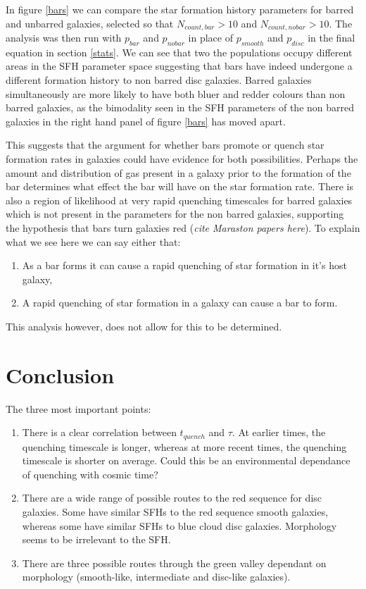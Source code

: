 \documentclass{mn2e}
\begin{document}
In figure \ref{bars} we can compare the star formation history parameters for barred and unbarred galaxies, selected so that $N_{count, bar} > 10$ and $N_{count, no bar} > 10$. The analysis was then run with $p_{bar}$ and $p_{no bar}$ in place of $p_{smooth}$ and $p_{disc}$ in the final equation in section \ref{stats}. We can see that two the populations occupy different areas in the SFH parameter space suggesting that bars have indeed undergone a different formation history to non barred disc galaxies.  Barred galaxies simultaneously are more likely to have both bluer and redder colours than non barred galaxies, as the bimodality seen in the SFH parameters of the non barred galaxies in the right hand panel of figure \ref{bars} has moved apart. 

This suggests that the argument for whether bars promote or quench star formation rates in galaxies could have evidence for both possibilities. Perhaps the amount and distribution of gas present in a galaxy prior to the formation of the bar determines what effect the bar will have on the star formation rate. There is also a region of likelihood at very rapid quenching timescales for barred galaxies which is not present in the parameters for the non barred galaxies, supporting the hypothesis that bars turn galaxies red (\emph{cite Maraston papers here}). To explain what we see here we can say either that:
\begin{enumerate}
\item As a bar forms it can cause a rapid quenching of star formation in it's host galaxy,
\item A rapid quenching of star formation in a galaxy can cause a bar to form.
\end{enumerate}
This analysis however, does not allow for this to be determined. 

\section{Conclusion}\label{conc}
The three most important points: 
\begin{enumerate}
\item There is a clear correlation between $t_{quench}$ and $\tau$. At earlier times, the quenching timescale is longer, whereas at more recent times, the quenching timescale is shorter on average. Could this be an environmental dependance of quenching with cosmic time?
\item There are a wide range of possible routes to the red sequence for disc galaxies. Some have similar SFHs to the red sequence smooth galaxies, whereas some have similar SFHs to blue cloud disc galaxies. Morphology seems to be irrelevant to the SFH. 
\item There are three possible routes through the green valley dependant on morphology (smooth-like, intermediate and disc-like galaxies).
\end{enumerate}
\end{document}
